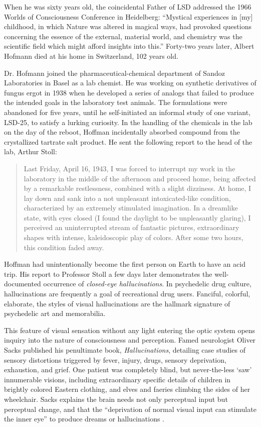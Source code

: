 \documentclass{UIdahoMastersThesis}
\begin{document}
When he was sixty years old, the coincidental Father of LSD addressed the 1966 Worlds of Consciousness Conference in Heidelberg: \enquote{Mystical experiences in [my] childhood, in which Nature was altered in magical ways, had provoked questions concerning the essence of the external, material world, and chemistry was the scientific field which might afford insights into this.} Forty-two years later, Albert Hofmann died at his home in Switzerland, 102 years old.

Dr. Hofmann joined the pharmaceutical-chemical department of Sandoz Laboratories in Basel as a lab chemist. He was working on synthetic derivatives of fungus ergot in 1938 when he developed a series of analogs that failed to produce the intended goals in the laboratory test animals. The formulations were abandoned for five years, until he self-initiated an informal study of one variant, LSD-25, to satisfy a lurking curiosity.
In the handling of the chemicals in the lab on the day of the reboot, Hoffman incidentally absorbed compound from the crystallized tartrate salt product. He sent the following report to the head of the lab, Arthur Stoll:

\begin{quote}
{Last Friday, April 16, 1943, I was forced to interrupt my work in the laboratory in the middle of the afternoon and proceed home, being affected by a remarkable restlessness, combined with a slight dizziness. At home, I lay down and sank into a not unpleasant intoxicated-like condition, characterized by an extremely stimulated imagination. In a dreamlike state, with eyes closed (I found the daylight to be unpleasantly glaring), I perceived an uninterrupted stream of fantastic pictures, extraordinary shapes with intense, kaleidoscopic play of colors. After some two hours, this condition faded away.}\cite{hofmann_lsd:_1980}
\end{quote}

Hoffman had unintentionally become the first person on Earth to have an acid trip. His report to Professor Stoll a few days later demonstrates the well-documented occurrence of \emph{closed-eye hallucinations}. In psychedelic drug culture, hallucinations are frequently a goal of recreational drug users. Fanciful, colorful, elaborate, the styles of visual hallucinations are the hallmark signature of psychedelic art and memorabilia. 

This feature of visual sensation without any light entering the optic system opens inquiry into the nature of consciousness and perception. Famed neurologist Oliver Sacks published his penultimate book, \emph{Hallucinations}, detailing case studies of sensory distortions triggered by fever, injury, drugs, sensory deprivation, exhaustion, and grief. One patient was completely blind, but never-the-less `saw' innumerable visions, including extraordinary specific details of children in brightly colored Eastern clothing, and elves and faeries climbing the sides of her wheelchair. Sacks explains the brain needs not only perceptual input but perceptual change, and that the ``deprivation of normal visual input can stimulate the inner eye'' to produce dreams or hallucinations \cite{sacks_hallucinations_2012}.
\end{document}
